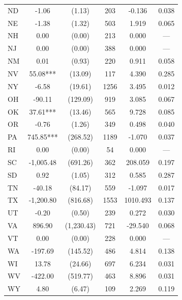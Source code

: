 \begin{tabular}{lccccc}
ND & -1.06 & (1.13) & 203 & -0.136 & 0.038\\
NE & -1.38 & (1.32) & 503 & 1.919 & 0.065\\
NH & 0.00 & (0.00) & 213 & 0.000 & —\\
\addlinespace
NJ & 0.00 & (0.00) & 388 & 0.000 & —\\
NM & 0.01 & (0.93) & 220 & 0.911 & 0.058\\
NV & 55.08*** & (13.09) & 117 & 4.390 & 0.285\\
NY & -6.58 & (19.61) & 1256 & 3.495 & 0.012\\
OH & -90.11 & (129.09) & 919 & 3.085 & 0.067\\
\addlinespace
OK & 37.61*** & (13.46) & 565 & 9.728 & 0.085\\
OR & -0.76 & (1.26) & 349 & 0.498 & 0.040\\
PA & 745.85*** & (268.52) & 1189 & -1.070 & 0.037\\
RI & 0.00 & (0.00) & 54 & 0.000 & —\\
SC & -1,005.48 & (691.26) & 362 & 208.059 & 0.197\\
\addlinespace
SD & 0.92 & (1.05) & 312 & 0.585 & 0.287\\
TN & -40.18 & (84.17) & 559 & -1.097 & 0.017\\
TX & -1,200.80 & (816.68) & 1553 & 1010.493 & 0.137\\
UT & -0.20 & (0.50) & 239 & 0.272 & 0.030\\
VA & 896.90 & (1,230.43) & 721 & -29.540 & 0.068\\
\addlinespace
VT & 0.00 & (0.00) & 228 & 0.000 & —\\
WA & -197.69 & (145.52) & 486 & 4.814 & 0.138\\
WI & 13.78 & (24.66) & 697 & 6.234 & 0.031\\
WV & -422.00 & (519.77) & 463 & 8.896 & 0.031\\
WY & 4.80 & (6.47) & 109 & 2.269 & 0.119\\
\bottomrule
\end{tabular}
